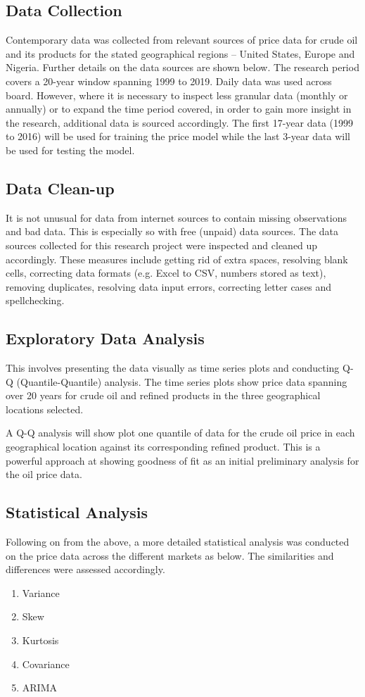 \documentclass[a4paper,10pt]{article}
\begin{document}
\subsection*{Data Collection}
Contemporary data was collected from relevant sources of price data for crude oil and its products for the stated geographical regions – United States, Europe and Nigeria. Further details on the data sources are shown below. The research period covers a 20-year window spanning 1999 to 2019. Daily data was used across board. However, where it is necessary to inspect less granular data (monthly or annually) or to expand the time period covered, in order to gain more insight in the research, additional data is sourced accordingly. The first 17-year data (1999 to 2016) will be used for training the price model while the last 3-year data will be used for testing the model.
\subsection*{Data Clean-up}
It is not unusual for data from internet sources to contain missing observations and bad data. This is especially so with free (unpaid) data sources. The data sources collected for this research project were inspected and cleaned up accordingly. These measures include getting rid of extra spaces, resolving blank cells, correcting data formats (e.g. Excel to CSV, numbers stored as text), removing duplicates, resolving data input errors, correcting letter cases and spellchecking.
\subsection*{Exploratory Data Analysis}
This involves presenting the data visually as time series plots and conducting Q-Q (Quantile-Quantile) analysis. The time series plots show price data spanning over 20 years for crude oil and refined products in the three geographical locations selected.

A Q-Q analysis will show plot one quantile of data for the crude oil price in each geographical location against its corresponding refined product. This is a powerful approach at showing goodness of fit as an initial preliminary analysis for the oil price data.
\subsection*{Statistical Analysis}
Following on from the above, a more detailed statistical analysis was conducted on the price data across the different markets as below. The similarities and differences were assessed accordingly.
\begin{enumerate}
    \item Variance
    \item Skew
    \item Kurtosis
    \item Covariance
    \item ARIMA
\end{enumerate}
\end{document}
